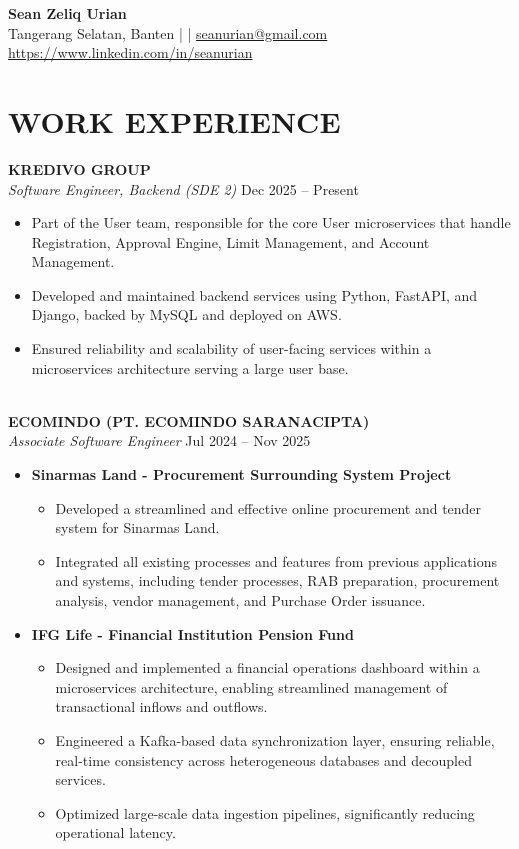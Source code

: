 \documentclass[a4paper,10pt]{article}
\begin{document}
\begin{center}
    {\LARGE \textbf{Sean Zeliq Urian}} \\
    \vspace{0.5em}
    Tangerang Selatan, Banten \quad |  \quad | \quad \href{mailto:seanurian@gmail.com}{seanurian@gmail.com} \\
    \href{https://www.linkedin.com/in/seanurian}{https://www.linkedin.com/in/seanurian}
\end{center}

\vspace{1em}
\section*{WORK EXPERIENCE}

\textbf{KREDIVO GROUP} \\
\textit{Software Engineer, Backend (SDE 2)} \hfill Dec 2025 -- Present
\begin{itemize}
    \item Part of the User team, responsible for the core User microservices that handle Registration, Approval Engine, Limit Management, and Account Management.
    \item Developed and maintained backend services using Python, FastAPI, and Django, backed by MySQL and deployed on AWS.
    \item Ensured reliability and scalability of user-facing services within a microservices architecture serving a large user base.
\end{itemize}\\
\textbf{ECOMINDO (PT. ECOMINDO SARANACIPTA)} \\
\textit{Associate Software Engineer} \hfill Jul 2024 -- Nov 2025
\begin{itemize}
    \item \textbf{Sinarmas Land - Procurement Surrounding System Project}
    \begin{itemize}
        \item Developed a streamlined and effective online procurement and tender system for Sinarmas Land.
        \item Integrated all existing processes and features from previous applications and systems, including tender processes, RAB preparation, procurement analysis, vendor management, and Purchase Order issuance.
    \end{itemize}
    \item \textbf{IFG Life - Financial Institution Pension Fund}
    \begin{itemize}
        \item Designed and implemented a financial operations dashboard within a microservices architecture, enabling streamlined management of transactional inflows and outflows.
        \item Engineered a Kafka-based data synchronization layer, ensuring reliable, real-time consistency across heterogeneous databases and decoupled services.
        \item Optimized large-scale data ingestion pipelines, significantly reducing operational latency.
    \end{itemize}
\end{itemize} \\
\end{document}
